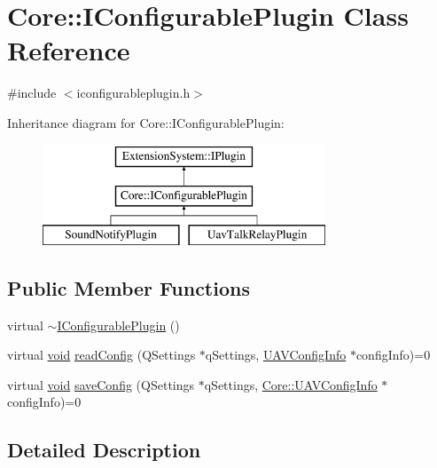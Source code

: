 \hypertarget{class_core_1_1_i_configurable_plugin}{\section{\-Core\-:\-:\-I\-Configurable\-Plugin \-Class \-Reference}
\label{class_core_1_1_i_configurable_plugin}
}


{\ttfamily \#include $<$iconfigurableplugin.\-h$>$}

\-Inheritance diagram for \-Core\-:\-:\-I\-Configurable\-Plugin\-:\begin{figure}[H]
\begin{center}
\leavevmode
\includegraphics[height=3.000000cm]{class_core_1_1_i_configurable_plugin}
\end{center}
\end{figure}
\subsection*{\-Public \-Member \-Functions}
\begin{DoxyCompactItemize}
\item 
virtual \hyperlink{class_core_1_1_i_configurable_plugin_a88fcd256bc60afd70ac67cb5a0ef3a0e}{$\sim$\-I\-Configurable\-Plugin} ()
\item 
virtual \hyperlink{group___u_a_v_objects_plugin_ga444cf2ff3f0ecbe028adce838d373f5c}{void} \hyperlink{class_core_1_1_i_configurable_plugin_af40567d082a243282cda71b3f9efd83f}{read\-Config} (\-Q\-Settings $\ast$q\-Settings, \hyperlink{class_core_1_1_u_a_v_config_info}{\-U\-A\-V\-Config\-Info} $\ast$config\-Info)=0
\item 
virtual \hyperlink{group___u_a_v_objects_plugin_ga444cf2ff3f0ecbe028adce838d373f5c}{void} \hyperlink{class_core_1_1_i_configurable_plugin_afd0c67d4dbb9ff64ca7a3bed07eb5b66}{save\-Config} (\-Q\-Settings $\ast$q\-Settings, \hyperlink{class_core_1_1_u_a_v_config_info}{\-Core\-::\-U\-A\-V\-Config\-Info} $\ast$config\-Info)=0
\end{DoxyCompactItemize}


\subsection{\-Detailed \-Description}


